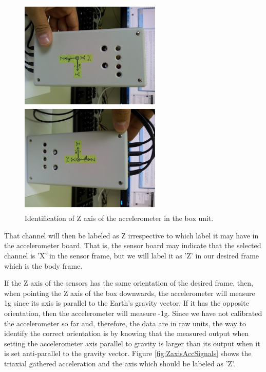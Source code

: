 \begin{figure}[H]
\centering
\includegraphics[width=0.6\textwidth]{figures/AccZaxis.jpg}
\caption{Identification of Z axis of the accelerometer in the box unit.}
\label{fig:AccZaxis}
\end{figure}
 
That channel will then be labeled as Z irrespective to which label it may have in the accelerometer board. That is, the sensor board may indicate that the selected channel is 'X' in the sensor frame, but we will label it as 'Z' in our desired frame which is the body frame. 

If the Z axis of the sensors has the same orientation of the desired frame, then, when pointing the Z axis of the box downwards, the accelerometer will measure 1g since its axis is parallel to the Earth's gravity vector. If it has the opposite orientation, then the accelerometer will measure -1g. Since we have not calibrated the accelerometer so far and, therefore, the data are in raw units, the way to identify the correct orientation is by knowing that the measured output when setting the accelerometer axis parallel to gravity is larger than its output when it is set anti-parallel to the gravity vector. Figure \ref{fig:ZaxisAccSignals} shows the triaxial gathered acceleration and the axis which should be labeled as 'Z'.

